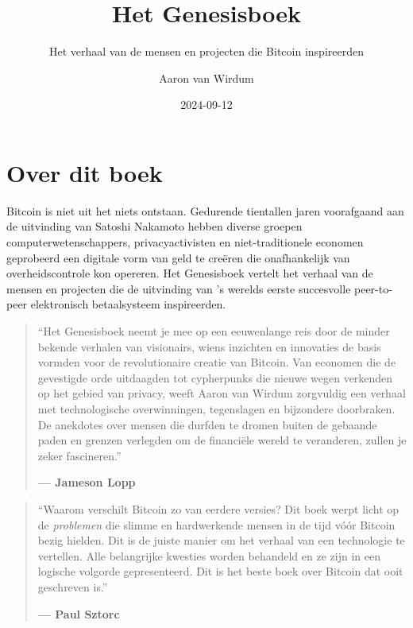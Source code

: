 \documentclass[
  a5paper,
  smalldemyvopaper,11pt,twoside,onecolumn,openright,extrafontsizes]{memoir}
\title{Het Genesisboek}
\subtitle{Het verhaal van de mensen en projecten die Bitcoin
inspireerden}
\author{Aaron van Wirdum}
\date{2024-09-12}
\renewcommand*\contentsname{Table of contents}
\newcommand\contentsname{Table of contents}
\begin{document}
\frontmatter
\maketitle

\renewcommand*\contentsname{Table of contents}
{
\hypersetup{linkcolor=}
\setcounter{tocdepth}{2}
\tableofcontents
}

\mainmatter
{}

\chapter*{Over dit boek}\label{over-dit-boek}


Bitcoin is niet uit het niets ontstaan. Gedurende tientallen jaren
voorafgaand aan de uitvinding van Satoshi Nakamoto hebben diverse
groepen computerwetenschappers, privacyactivisten en niet-traditionele
economen geprobeerd een digitale vorm van geld te creëren die
onafhankelijk van overheidscontrole kon opereren. Het Genesisboek
vertelt het verhaal van de mensen en projecten die de uitvinding van 's
werelds eerste succesvolle peer-to-peer elektronisch betaalsysteem
inspireerden.

\begin{quote}
``Het Genesisboek neemt je mee op een eeuwenlange reis door de minder
bekende verhalen van visionairs, wiens inzichten en innovaties de basis
vormden voor de revolutionaire creatie van Bitcoin. Van economen die de
gevestigde orde uitdaagden tot cypherpunks die nieuwe wegen verkenden op
het gebied van privacy, weeft Aaron van Wirdum zorgvuldig een verhaal
met technologische overwinningen, tegenslagen en bijzondere doorbraken.
De anekdotes over mensen die durfden te dromen buiten de gebaande paden
en grenzen verlegden om de financiële wereld te veranderen, zullen je
zeker fascineren.''

\textbf{--- Jameson Lopp}
\end{quote}

\begin{quote}
``Waarom verschilt Bitcoin zo van eerdere versies? Dit boek werpt licht
op de \emph{problemen} die slimme en hardwerkende mensen in de tijd vóór
Bitcoin bezig hielden. Dit is de juiste manier om het verhaal van een
technologie te vertellen. Alle belangrijke kwesties worden behandeld en
ze zijn in een logische volgorde gepresenteerd. Dit is het beste boek
over Bitcoin dat ooit geschreven is.''

\textbf{--- Paul Sztorc}
\end{quote}
\end{document}
